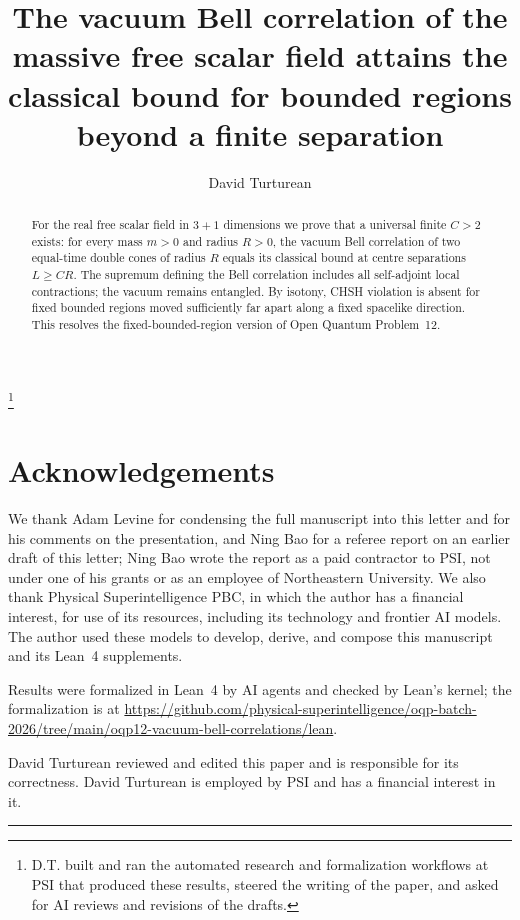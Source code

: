 \documentclass[aps,prl,reprint,longbibliography,raggedbottom]{revtex4-2}
\begin{document}
\title{The vacuum Bell correlation of the massive free scalar field
attains the classical bound for bounded regions beyond a finite
separation}
\author{David Turturean}\thanks{D.T. built and ran the automated research and formalization workflows at PSI that produced these results, steered the writing of the paper, and asked for AI reviews and revisions of the drafts.}

\begin{abstract}
For the real free scalar field in $3+1$ dimensions we prove that a
universal finite $C>2$ exists: for every mass $m>0$ and radius $R>0$,
the vacuum Bell correlation of two equal-time double cones of radius
$R$ equals its classical bound at centre separations $L\ge CR$. The
supremum defining the Bell correlation includes all self-adjoint local
contractions; the vacuum remains entangled. By isotony, CHSH violation
is absent for fixed bounded regions moved sufficiently far apart along
a fixed spacelike direction. This resolves the fixed-bounded-region
version of Open Quantum Problem~12.
\end{abstract}

\maketitle

{\raggedright\setlength{\parskip}{0.4\baselineskip}
\section*{Acknowledgements}

We thank Adam Levine for condensing the full manuscript into this letter and for his comments on the presentation, and Ning Bao for a referee report on an earlier draft of this letter; Ning Bao wrote the report as a paid contractor to PSI, not under one of his grants or as an employee of Northeastern University. We also thank Physical Superintelligence PBC, in which the author has a financial interest, for use of its resources, including its technology and frontier AI models. The author used these models to develop, derive, and compose this manuscript and its Lean~4 supplements.

Results were formalized in Lean~4 by AI agents and checked by Lean's kernel; the formalization is at \url{https://github.com/physical-superintelligence/oqp-batch-2026/tree/main/oqp12-vacuum-bell-correlations/lean}.

David Turturean reviewed and edited this paper and is responsible for its correctness. David Turturean is employed by PSI and has a financial interest in it.

\par}
\par\medskip\noindent\rule{\columnwidth}{0.4pt}\par\medskip
\end{document}
